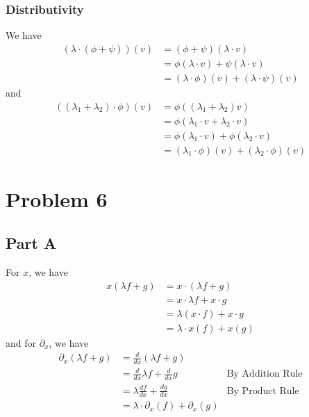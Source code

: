 \documentclass[12pt]{article}
\begin{document}
\subsubsection{Distributivity}

We have
\begin{align*}
  (\lambda \cdot (\phi + \psi))(v)
   & = (\phi+\psi)(\lambda \cdot v)                      \\
   & = \phi(\lambda \cdot v) + \psi(\lambda \cdot v)     \\
   & = (\lambda \cdot \phi)(v) + (\lambda \cdot \psi)(v)
\end{align*}
and
\begin{align*}
  ((\lambda_1+\lambda_2) \cdot \phi)(v)
   & = \phi((\lambda_1+\lambda_2)v)                          \\
   & = \phi(\lambda_1 \cdot v + \lambda_2 \cdot v)           \\
   & = \phi(\lambda_1 \cdot v) + \phi(\lambda_2 \cdot v)     \\
   & = (\lambda_1 \cdot \phi)(v) + (\lambda_2 \cdot \phi)(v)
\end{align*}

\pagebreak

\section{Problem 6}

\subsection{Part A}

For $x$, we have
\begin{align*}
  x(\lambda f + g)
   & = x \cdot (\lambda f + g)        \\
   & = x \cdot \lambda f + x \cdot g        \\
   & = \lambda(x \cdot f) + x \cdot g \\
   & = \lambda \cdot x(f) + x(g)
\end{align*}
and for $\partial_x$, we have
\begin{align*}
  \partial_x(\lambda f + g)
   & = \frac{d}{dx} (\lambda f + g)                                          \\
   & = \frac{d}{dx} \lambda f + \frac{d}{dx} g     & \text{By Addition Rule} \\
   & = \lambda \frac{df}{dx} + \frac{dg}{dx}       & \text{By Product Rule}  \\
   & = \lambda \cdot \partial_x(f) + \partial_x(g)
\end{align*}
\end{document}
